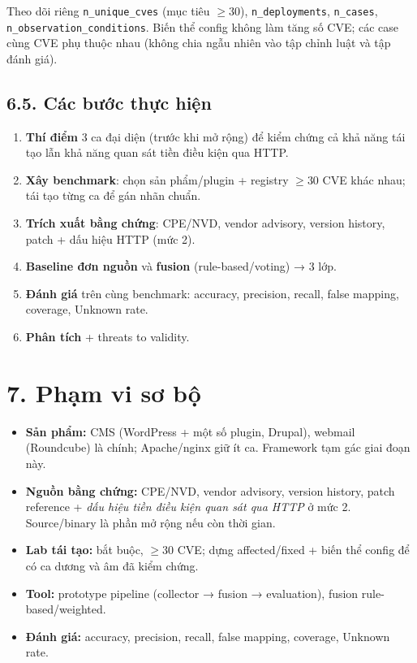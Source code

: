 \documentclass[11pt,a4paper]{article}
\begin{document}
Theo dõi riêng \texttt{n\_unique\_cves} (mục tiêu $\ge 30$), \texttt{n\_deployments}, \texttt{n\_cases}, \texttt{n\_observation\_conditions}. Biến thể config không làm tăng số CVE; các case cùng CVE phụ thuộc nhau (không chia ngẫu nhiên vào tập chỉnh luật và tập đánh giá).

\subsection*{6.5. Các bước thực hiện}

\begin{enumerate}
  \item \textbf{Thí điểm} 3 ca đại diện (trước khi mở rộng) để kiểm chứng cả khả năng tái tạo lẫn khả năng quan sát tiền điều kiện qua HTTP.
  \item \textbf{Xây benchmark}: chọn sản phẩm/plugin + registry $\ge 30$ CVE khác nhau; tái tạo từng ca để gán nhãn chuẩn.
  \item \textbf{Trích xuất bằng chứng}: CPE/NVD, vendor advisory, version history, patch + dấu hiệu HTTP (mức 2).
  \item \textbf{Baseline đơn nguồn} và \textbf{fusion} (rule-based/voting) → 3 lớp.
  \item \textbf{Đánh giá} trên cùng benchmark: accuracy, precision, recall, false mapping, coverage, Unknown rate.
  \item \textbf{Phân tích} + threats to validity.
\end{enumerate}

\section*{7. Phạm vi sơ bộ}

\begin{itemize}
  \item \textbf{Sản phẩm:} CMS (WordPress + một số plugin, Drupal), webmail (Roundcube) là chính; Apache/nginx giữ ít ca. Framework tạm gác giai đoạn này.
  \item \textbf{Nguồn bằng chứng:} CPE/NVD, vendor advisory, version history, patch reference + \emph{dấu hiệu tiền điều kiện quan sát qua HTTP} ở mức 2. Source/binary là phần mở rộng nếu còn thời gian.
  \item \textbf{Lab tái tạo:} bắt buộc, $\ge 30$ CVE; dựng affected/fixed + biến thể config để có ca dương và âm đã kiểm chứng.
  \item \textbf{Tool:} prototype pipeline (collector → fusion → evaluation), fusion rule-based/weighted.
  \item \textbf{Đánh giá:} accuracy, precision, recall, false mapping, coverage, Unknown rate.
\end{itemize}
\end{document}
